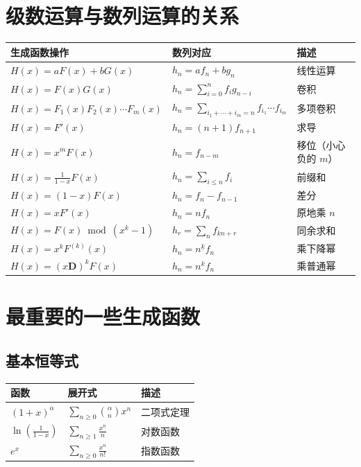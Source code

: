 \documentclass[11pts, a4paper]{ctexart}
\begin{document}
\section{级数运算与数列运算的关系}

\begin{center}
\begin{tabular}{lll}
\toprule
生成函数操作 & 数列对应 & 描述 \\
\midrule
$H(x)=aF(x)+bG(x)$ & $h_n=af_n+bg_n$ & 线性运算 \\
$H(x)=F(x)G(x)$ & $h_n=\sum_{i=0}^n f_ig_{n-i}$ & 卷积 \\
$H(x)=F_1(x)F_2(x)\cdots F_m(x)$ & $h_n=\sum_{i_1+\cdots+i_m=n}f_{i_1}\cdots f_{i_m}$ & 多项卷积 \\
$H(x)=F'(x)$ & $h_n=(n+1)f_{n+1}$ & 求导 \\
$H(x)=x^mF(x)$ & $h_n=f_{n-m}$ & 移位（小心负的 $m$）\\
$H(x)=\frac{1}{1-x}F(x)$ & $h_n=\sum_{i\le n}f_i$ & 前缀和 \\
$H(x)=(1-x)F(x)$ & $h_n=f_n-f_{n-1}$ & 差分 \\
$H(x)=xF'(x)$ & $h_n=nf_n$ & 原地乘 $n$ \\
$H(x)=F(x)\bmod (x^k-1)$ & $h_r=\sum_n f_{kn+r}$ & 同余求和 \\
$H(x)=x^kF^{(k)}(x)$ & $h_n=n^{\underline{k}}f_n$ & 乘下降幂 \\
$H(x)=(x\mathbf D)^kF(x)$ & $h_n=n^k f_n$ & 乘普通幂 \\
\bottomrule
\end{tabular}
\end{center}



\section{最重要的一些生成函数}

\subsection*{基本恒等式}

\begin{center}
\begin{tabular}{lll}
\toprule
函数 & 展开式 & 描述 \\
\midrule
$(1+x)^{\alpha}$ & $\sum_{n\ge 0}\binom{\alpha}{n}x^n$ & 二项式定理 \\
$\ln\left(\frac{1}{1-x}\right)$ & $\sum_{n\ge 1}\frac{x^n}{n}$ & 对数函数 \\
$e^x$ & $\sum_{n\ge 0}\frac{x^n}{n!}$ & 指数函数 \\
\bottomrule
\end{tabular}
\end{center}
\end{document}
